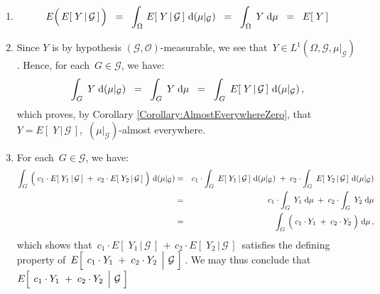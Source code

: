 \begin{enumerate}
\item
	\begin{equation*}
	E\!\left(\,\overset{{\color{white}.}}{E}\!\left[\;Y\,\vert\,\mathcal{G}\,\right]\,\right)
	\;\; = \;\;
		\int_{\Omega}\,\overset{{\color{white}.}}{E}\!\left[\;Y\,\vert\,\mathcal{G}\,\right]\,\d(\mu\vert_{\mathcal{G}})
	\;\; = \;\;
		\int_{\Omega}\;Y\;\d\mu
	\;\; = \;\;
		E\!\left[\;Y\,\right]
	\end{equation*}
\item
	Since $Y$ is by hypothesis $(\mathcal{G},\mathcal{O})$-measurable, we see that
	\,$Y \in L^{1}(\Omega,\mathcal{G},\mu\vert_{\mathcal{G}})$.
	Hence, for each \,$G \in \mathcal{G}$, we have:
	\begin{equation*}
	\int_{G}\;Y\;\textnormal{d}(\mu\vert_{\mathcal{G}})
	\;\; = \;\;
		\int_{G}\;Y\;\textnormal{d}\mu
	\;\; = \;\;
		\int_{G}\;E\!\left[\;Y\,\vert\,\mathcal{G}\,\right]\,\textnormal{d}(\mu\vert_{\mathcal{G}})\,,
	\end{equation*}
	which proves, by Corollary \ref{Corollary:AlmostEverywhereZero}, that
	\,$Y = E\!\left[\;Y\,\vert\,\mathcal{G}\,\right]$,\,
	$(\mu\vert_{\mathcal{G}})$-almost everywhere.
\item
	For each \,$G \in \mathcal{G}$, we have:
	\begin{eqnarray*}
	\int_{G}\,\left(\;
		c_{1}\cdot E\!\left[\;Y_{1}\,\vert\,\mathcal{G}\,\right]
		\; \overset{{\color{white}.}}{+} \;
		c_{2}\cdot E\!\left[\;Y_{2}\,\vert\,\mathcal{G}\,\right]	
		\;\right)\,\d(\mu\vert_{\mathcal{G}})
	&=&
		c_{1} \cdot \int_{G}\;
			E\!\left[\;Y_{1}\,\vert\,\mathcal{G}\,\right]
			\,\d(\mu\vert_{\mathcal{G}})
		\; \overset{{\color{white}.}}{+} \;
		c_{2} \cdot \int_{G}\;
			E\!\left[\;Y_{2}\,\vert\,\mathcal{G}\,\right]	
			\,\d(\mu\vert_{\mathcal{G}})
	\\
	&=&
		c_{1} \cdot \int_{G}\;
			Y_{1}
			\;\d\mu
		\; \overset{{\color{white}.}}{+} \;
		c_{2} \cdot \int_{G}\;
			Y_{2}
			\;\d\mu
	\\
	&=&
		 \int_{G}\,\left(\;
			c_{1} \cdot Y_{1}
			\; \overset{{\color{white}.}}{+} \;
			c_{2} \cdot Y_{2}
			\;\right)\,\d\mu\,,
	\end{eqnarray*}
	which shows that
	\,$c_{1}\cdot E\!\left[\;Y_{1}\,\vert\,\mathcal{G}\,\right] \,+\, c_{2}\cdot E\!\left[\;Y_{2}\,\vert\,\mathcal{G}\,\right]$\,
	satisfies the defining property of 
	\,$E\!\left[\;\left.c_{1}\cdot Y_{1}\;\overset{{\color{white}.}}{+}\;c_{2}\cdot Y_{2}\,\;\right\vert\,\mathcal{G}\;\right]$\,.
	We may thus conclude that
	\,$E\!\left[\;\left.c_{1}\cdot Y_{1}\;\overset{{\color{white}.}}{+}\;c_{2}\cdot Y_{2}\,\;\right\vert\,\mathcal{G}\;\right]$

\end{enumerate}
